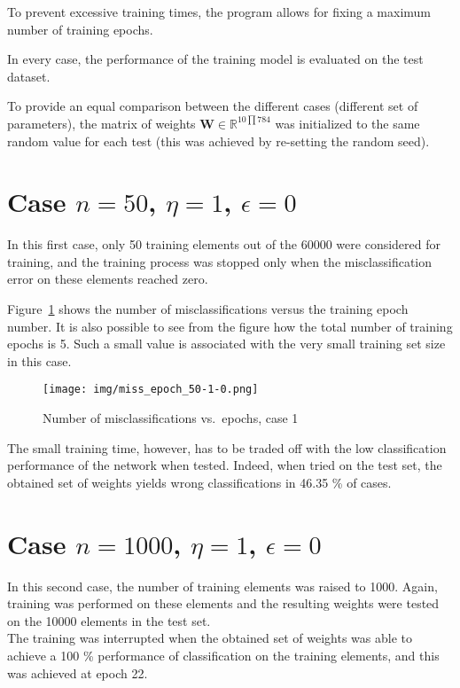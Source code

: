 \documentclass[12pt]{article}
\begin{document}
To prevent excessive training times, the program allows for fixing a maximum number of training epochs.

In every case, the performance of the training model is evaluated on the test dataset.

To provide an equal comparison between the different cases (different set of parameters), the matrix of weights $\textbf{W} \in \mathbb{R}^{10 \prod 784}$ was initialized to the same random value for each test (this was achieved by re-setting the random seed).

\section{Case $n=50$, $\eta=1$, $\epsilon=0$}

In this first case, only 50 training elements out of the 60000 were considered for training, and the training process was stopped only when the misclassification error on these elements reached zero.

Figure\ \ref{fig:50_1_0} shows the number of misclassifications versus the training epoch number.
It is also possible to see from the figure how the total number of training epochs is 5.
Such a small value is associated with the very small training set size in this case.

\begin{figure}[ht]
  \centering
  \texttt{[image: img/miss\_epoch\_50-1-0.png]}
  \caption{Number of misclassifications vs.\ epochs, case 1}
  \label{fig:50_1_0}
\end{figure}

The small training time, however, has to be traded off with the low classification performance of the network when tested.
Indeed, when tried on the test set, the obtained set of weights yields wrong classifications in 46.35 \% of cases.

\section{Case $n=1000$, $\eta=1$, $\epsilon=0$}

In this second case, the number of training elements was raised to 1000.
Again, training was performed on these elements and the resulting weights were tested on the 10000 elements in the test set.\\
The training was interrupted when the obtained set of weights was able to achieve a 100 \% performance of classification on the training elements, and this was achieved at epoch 22.
\end{document}
